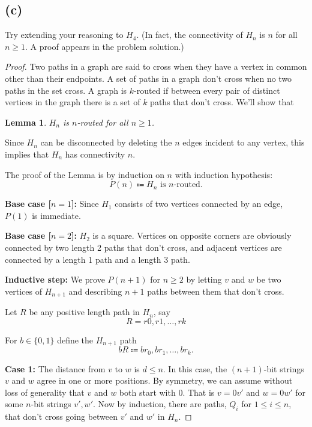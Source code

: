 \documentclass[14pt]{extarticle}
\newtheorem{lemma}{Lemma}
\begin{document}
\subsection{(c)}
Try extending your reasoning to $H_4$. (In fact, the connectivity of $H_n$ is $n$ for all $n \geq 1$. A proof appears in the problem solution.)

\begin{proof}
Two paths in a graph are said to cross when they have a vertex in common other than their endpoints. A set of paths in a graph don’t cross when no two paths in the set cross. A graph is $k$-routed if between every pair of distinct vertices in the graph there is a set of $k$ paths that don’t cross. We’ll show that

\begin{lemma}
$H_n$ is $n$-routed for all $n \geq 1$.
\end{lemma}

Since $H_n$ can be disconnected by deleting the $n$ edges incident to any vertex, this implies that $H_n$ has connectivity $n$.

The proof of the Lemma is by induction on $n$ with induction hypothesis:
$$
P(n) \Coloneqq H_n \text{ is $n$-routed}.
$$

{\bf Base case [$n = 1$]:} Since $H_1$ consists of two vertices connected by an edge, $P (1)$ is immediate.

{\bf Base case [$n = 2$]:} $H_2$ is a square. Vertices on opposite corners are obviously connected by two length 2 paths that don’t cross, and adjacent vertices are connected by a length 1 path and a length 3 path.

{\bf Inductive step:} We prove $P (n + 1)$ for $n \geq 2$ by letting $v$ and $w$ be two vertices of $H_{n+1}$ and describing $n + 1$ paths between them that don’t cross.

Let $R$ be any positive length path in $H_n$, say
$$
R = r0 , r1 , \ldots , rk
$$

For $b \in \{0, 1\}$ define the $H_{n+1}$ path
$$
bR \Coloneqq br_0 , br_1 , \ldots , br_k .
$$

{\bf Case 1:} The distance from $v$ to $w$ is $d \leq n$. In this case, the $(n + 1)$-bit strings $v$ and $w$ agree in one or more positions. By symmetry, we can assume without loss of generality that $v$ and $w$ both start with 0. That is $v = 0v'$ and $w = 0w'$ for some $n$-bit strings $v' , w'$. Now by induction, there are paths, $Q_i$ for $1\leq i \leq n$, that don’t cross going between $v'$ and $w'$ in $H_n$.


\end{proof}
\end{document}
